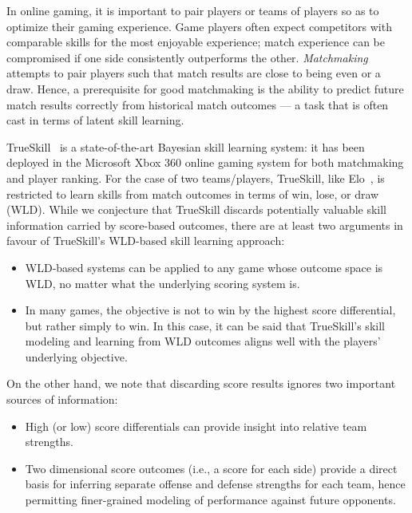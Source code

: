 In online gaming, it is important to pair players or teams of players
so as to optimize their gaming experience.  Game players often expect
competitors with comparable skills for the most enjoyable experience;
match experience can be compromised if one side consistently
outperforms the other.  \emph{Matchmaking} attempts to pair players
such that match results are close to being even or a draw.  Hence, a
prerequisite for good matchmaking is the ability to predict future
match results correctly from historical match outcomes --- a task
that is often cast in terms of latent skill learning.

TrueSkill~\cite{herbrich06569} is a state-of-the-art Bayesian skill
learning system: it has been deployed in the Microsoft Xbox 360 online
gaming system for both matchmaking and player ranking.  For the case
of two teams/players, TrueSkill, like
Elo~\cite{elo78TheRatingOfChessPlayers}, is restricted to learn skills
from match outcomes in terms of win, lose, or draw (WLD).
While we conjecture that TrueSkill discards potentially
valuable skill information carried by score-based outcomes,
there are at least two arguments in favour of TrueSkill's WLD-based
skill learning approach:
\begin{itemize}
\item WLD-based systems can be applied to any game whose outcome space
is WLD, no matter what the underlying scoring system is.
\item In many games, the objective is not to win by the highest
score differential, but rather simply to win.  In this case,
it can be said that TrueSkill's skill modeling and learning from WLD
outcomes aligns well with the players' underlying objective.
\end{itemize}
On the other hand, we note that discarding score results
ignores two important sources of information:
\begin{itemize}
\item High (or low) score
differentials can provide insight into relative team strengths.
\item Two dimensional score outcomes (i.e., a score for each side) provide a
direct basis for inferring separate offense and defense strengths for
each team, hence permitting finer-grained modeling of performance against
future opponents.
\end{itemize}

